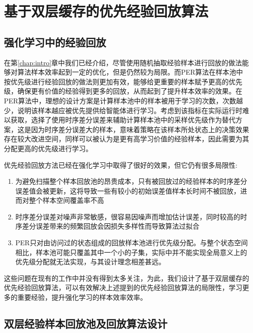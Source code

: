 
\chapter{基于双层缓存的优先经验回放算法}

\section{强化学习中的经验回放}

在第\ref{chap:intro}章中我们已经介绍，尽管使用随机抽取经验样本进行回放的做法能够对算法样本效率起到一定的优化，但是仍然较为局限。而PER算法在样本池中按优先级进行经验回放的做法则更加有效，能够给更重要的样本赋予更高的优先级，确保更有价值的经验得到更多的回放，从而起到了提升样本效率的效果。在PER算法中，理想的设计方案是计算样本池中的样本被用于学习的次数，次数越少，说明该样本越应被优先提供给智能体进行学习。考虑到该指标在实际运行时难以获取，选择了使用时序差分误差来辅助计算样本池中的采样优先级作为替代方案，这是因为时序差分误差大的样本，意味着策略在该样本所处状态上的决策效果存在较大改进空间，同样可以被认为是更有高学习价值的经验样本，因此需要为其分配更高的优先级进行学习。

优先经验回放方法已经在强化学习中取得了很好的效果，但它仍有很多局限性:

\begin{enumerate}
    \item 为避免扫描整个样本回放池的昂贵成本，只有被回放过的经验样本的时序差分误差值会被更新，这将导致一些有较小的初始误差值样本长时间不被回放，进而对整个样本空间覆盖率不高
    \item 时序差分误差对噪声非常敏感，很容易因噪声而增加估计误差，同时较高的时序差分误差带来的频繁回放会因损失多样性而导致算法过拟合
    \item PER只对由访问过的状态组成的回放样本池进行优先级分配。与整个状态空间相比，样本池可能只覆盖其中一个小的子集，实际中并不能实现全局意义上的优先级分配就无法实现，与其设计理念相差甚远。
\end{enumerate}

这些问题在现有的工作中并没有得到太多关注，为此，我们设计了基于双层缓存的优先经验回放算法，可以有效解决上述提到的优先经验回放算法的局限性，学习更多的重要经验，提升强化学习的样本效率效率。

\section{双层经验样本回放池及回放算法设计}

